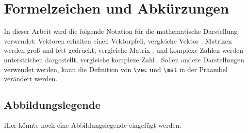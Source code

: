 \chapter*{Formelzeichen und Abkürzungen}

\manualmark
\chead{}
\cfoot{}
\ofoot*{\pagemark}

In dieser Arbeit wird die folgende Notation für die mathematische Darstellung verwendet: Vektoren erhalten einen Vektorpfeil, vergleiche Vektor , Matrizen werden groß und fett gedruckt, vergleiche Matrix , und komplexe Zahlen werden unterstrichen dargestellt, vergleiche komplexe Zahl . Sollen andere Darstellungen verwendet werden, kann die Definition von \texttt{\textbackslash vec} und \texttt{\textbackslash mat} in der Präambel verändert werden. 

\ifdefined\BUILDGLOSSARIES
	\printglossary[type=latin_symbols, style=symbols, title=Lateinische Formelzeichen]
	\newpage
	\printglossary[type=greek_symbols, style=symbols, title=Griechische Formelzeichen]
	\newpage
	\printglossary[type=indices, style=indices, title=Indizes]
	\newpage
	\printglossary[type=akronym, style=akronym, title=Abkürzungen]
\else 
\fi

\newpage\section*{Abbildungslegende}

Hier könnte noch eine Abbildungslegende eingefügt werden.